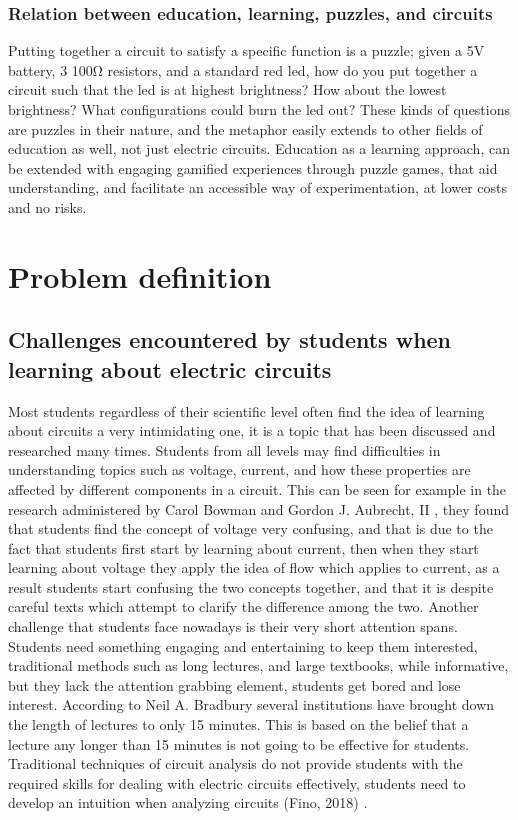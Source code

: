 \documentclass[../main.tex]{subfiles}
\begin{document}
\subsubsection{Relation between education, learning,  puzzles, and circuits}
Putting together a circuit to satisfy a specific function is a puzzle; given a 5V battery, 3 100Ω resistors, and a standard red \acrshort{led}, how do you put together a circuit such that the \acrshort{led} is at highest brightness? How about the lowest brightness? What configurations could burn the \acrshort{led} out? These kinds of questions are puzzles in their nature, and the metaphor easily extends to other fields of education as well, not just electric circuits. Education as a learning approach, can be extended with engaging gamified experiences through puzzle games, that aid understanding, and facilitate an accessible way of experimentation, at lower costs and no risks.




\section{Problem definition}
\subsection{Challenges encountered by students when learning about electric circuits}
Most students regardless of their scientific level often find the idea of learning about circuits a very intimidating one, it is a topic that has been discussed and researched many times. Students from all levels may find difficulties in understanding topics such as voltage, current, and how these properties are affected by different components in a circuit. This can be seen for example in the research administered by Carol Bowman and Gordon J. Aubrecht, II \cite{1}, they found that students find the concept of voltage very confusing, and that is due to the fact that students first start by learning about current, then when they start learning about voltage they apply the idea of flow which applies to current, as a result students start confusing the two concepts together, and that it is despite careful texts which attempt to clarify the difference among the two.
Another challenge that students face nowadays is their very short attention spans. Students need something engaging and entertaining to keep them interested, traditional methods such as long lectures, and large textbooks, while informative, but they lack the attention grabbing element, students get bored and lose interest. According to Neil A. Bradbury \cite{17} several institutions have brought down the length of lectures to only 15 minutes. This is based on the belief that a lecture any longer than 15 minutes is not going to be effective for students.
Traditional techniques of circuit analysis do not provide students with the required skills for dealing with electric circuits effectively, students need to develop an intuition when analyzing circuits (Fino, 2018) \cite{18}.
\end{document}
